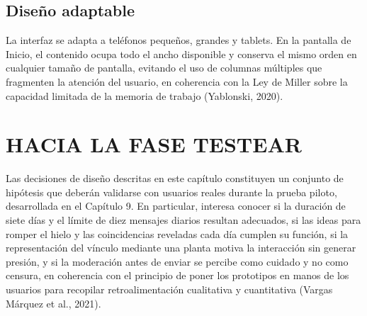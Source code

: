 \subsection{Diseño adaptable}
La interfaz se adapta a teléfonos pequeños, grandes y tablets. En la pantalla de Inicio, el contenido ocupa todo el ancho disponible y conserva el mismo orden en cualquier tamaño de pantalla, evitando el uso de columnas múltiples que fragmenten la atención del usuario, en coherencia con la Ley de Miller sobre la capacidad limitada de la memoria de trabajo (Yablonski, 2020).

\section{HACIA LA FASE TESTEAR}
Las decisiones de diseño descritas en este capítulo constituyen un conjunto de hipótesis que deberán validarse con usuarios reales durante la prueba piloto, desarrollada en el Capítulo 9. En particular, interesa conocer si la duración de siete días y el límite de diez mensajes diarios resultan adecuados, si las ideas para romper el hielo y las coincidencias reveladas cada día cumplen su función, si la representación del vínculo mediante una planta motiva la interacción sin generar presión, y si la moderación antes de enviar se percibe como cuidado y no como censura, en coherencia con el principio de poner los prototipos en manos de los usuarios para recopilar retroalimentación cualitativa y cuantitativa (Vargas Márquez et al., 2021).
